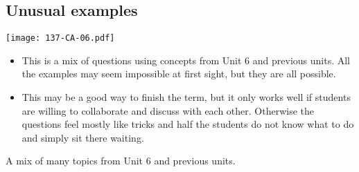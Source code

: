 \documentclass[11pt]{article}
\newcommand{\nl}{\hfill \vspace{-1.1\baselineskip}} %
\begin{document}
\newpage
\subsection{Unusual examples}

\begin{center}
{ \texttt{[image: 137-CA-06.pdf]}} 
\end{center}


\begin{comments}
\nl
	\begin{itemize}
		\item  This is a mix of questions using concepts from Unit 6 and previous units.  All the examples may seem impossible at first sight, but they are all possible.
		\item  This may be a good way to finish the term, but it only works well if students are willing to collaborate and discuss with each other.  Otherwise the questions feel mostly like tricks and half the students do not know what to do and simply sit there waiting.
	\end{itemize}
\end{comments}

\begin{videos}
A mix of many topics from Unit 6 and previous units.
\end{videos}

\newpage
\end{document}

